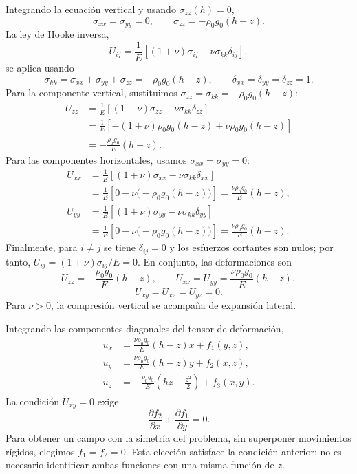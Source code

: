Integrando la ecuación vertical y usando $\sigma_{zz}(h)=0$,
\[
\boxed{\sigma_{xx}=\sigma_{yy}=0},
\qquad
\boxed{\sigma_{zz}=-\rho_0g_0(h-z)}.
\]
La ley de Hooke inversa,
\[
U_{ij}=\frac{1}{E}
\left[(1+\nu)\sigma_{ij}-\nu\sigma_{kk}\delta_{ij}\right],
\]
se aplica usando
\[
\sigma_{kk}=\sigma_{xx}+\sigma_{yy}+\sigma_{zz}
=-\rho_0g_0(h-z),
\qquad
\delta_{xx}=\delta_{yy}=\delta_{zz}=1.
\]
Para la componente vertical, sustituimos $\sigma_{zz}=\sigma_{kk}=-\rho_0g_0(h-z)$:
\[
\begin{aligned}
U_{zz}
&=\frac{1}{E}\left[(1+\nu)\sigma_{zz}-\nu\sigma_{kk}\delta_{zz}\right]\\
&=\frac{1}{E}\left[-(1+\nu)\rho_0g_0(h-z)
+\nu\rho_0g_0(h-z)\right]\\
&=-\frac{\rho_0g_0}{E}(h-z).
\end{aligned}
\]
Para las componentes horizontales, usamos $\sigma_{xx}=\sigma_{yy}=0$:
\[
\begin{aligned}
U_{xx}
&=\frac{1}{E}\left[(1+\nu)\sigma_{xx}-\nu\sigma_{kk}\delta_{xx}\right]\\
&=\frac{1}{E}\left[0-\nu\bigl(-\rho_0g_0(h-z)\bigr)\right]
=\frac{\nu\rho_0g_0}{E}(h-z),\\
U_{yy}
&=\frac{1}{E}\left[(1+\nu)\sigma_{yy}-\nu\sigma_{kk}\delta_{yy}\right]\\
&=\frac{1}{E}\left[0-\nu\bigl(-\rho_0g_0(h-z)\bigr)\right]
=\frac{\nu\rho_0g_0}{E}(h-z).
\end{aligned}
\]
Finalmente, para $i\ne j$ se tiene $\delta_{ij}=0$ y los esfuerzos cortantes son nulos; por tanto, $U_{ij}=(1+\nu)\sigma_{ij}/E=0$. En conjunto, las deformaciones son
\[
U_{zz}=-\frac{\rho_0g_0}{E}(h-z),
\qquad
U_{xx}=U_{yy}=\frac{\nu\rho_0g_0}{E}(h-z),
\]
\[
U_{xy}=U_{xz}=U_{yz}=0.
\]
Para $\nu>0$, la compresión vertical se acompaña de expansión lateral.

Integrando las componentes diagonales del tensor de deformación,
\[
\begin{aligned}
u_x&=\frac{\nu\rho_0g_0}{E}(h-z)x+f_1(y,z),\\
u_y&=\frac{\nu\rho_0g_0}{E}(h-z)y+f_2(x,z),\\
u_z&=-\frac{\rho_0g_0}{E}\left(hz-\frac{z^2}{2}\right)+f_3(x,y).
\end{aligned}
\]
La condición $U_{xy}=0$ exige
\[
\frac{\partial f_2}{\partial x}+\frac{\partial f_1}{\partial y}=0.
\]
Para obtener un campo con la simetría del problema, sin superponer movimientos rígidos, elegimos $f_1=f_2=0$. Esta elección satisface la condición anterior; no es necesario identificar ambas funciones con una misma función de $z$.

